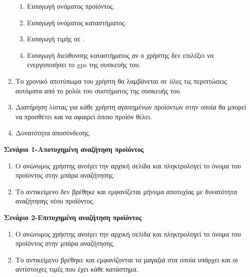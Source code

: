 \documentclass[12pt, oneside, a4paper]{report}
\begin{document}
\begin{enumerate}
\begin{enumerate}
     \item Εισαγωγή ονόματος προϊόντος.
     \item Εισαγωγή ονόματος καταστήματος.
     \item Εισαγωγή τιμής σε \texteuro.
     \item Εισαγωγή διεύθυνσης καταστήματος αν ο χρήστης δεν επιλέξει να ενεργοποιήσει το gps της συσκευής του.     
    \end{enumerate}
\item Το χρονικό αποτύπωμα του χρήστη θα λαμβάνεται σε όλες τις περιπτώσεις αυτόματα από το ρολόι του συστήματος της συσκευής του.
\item Διατήρηση λίστας για κάθε χρήστη αγαπημένων προϊόντων στην οποία θα μπορεί να προσθέτει και να αφαιρεί όποιο προϊόν θέλει.
\item Δυνατότητα αποσύνδεσης.
\end{enumerate}

\vspace{0.5cm}
\textbf{Σενάριο 1-Αποτυχημένη αναζήτηση προϊόντος}\\
\begin{enumerate}
 \item Ο  ανώνυμος χρήστης ανοίγει την αρχική σελίδα και πληκτρολογεί το όνομα του προϊόντος στην μπάρα αναζήτησης.
 \item Το αντικείμενο δεν βρέθηκε και εμφανίζεται μήνυμα αποτυχίας με δυνατότητα αναζήτησης νέου προϊόντος.
\end{enumerate}

\vspace{0.5cm}
\textbf{Σενάριο 2-Επιτυχημένη αναζήτηση προϊόντος}\\
\begin{enumerate}
 \item Ο  ανώνυμος χρήστης ανοίγει την αρχική σελίδα και πληκτρολογεί το όνομα του προϊόντος στην μπάρα αναζήτησης.
 \item Το αντικείμενο βρέθηκε και εμφανίζονται τα μαγαζιά στα οποία υπάρχει και οι αντίστοιχες τιμές που έχει κάθε κατάστημα.
\end{enumerate}
\end{document}

